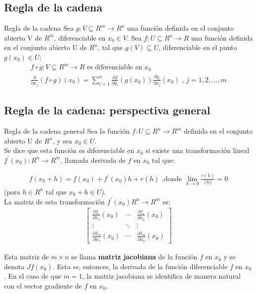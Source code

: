 \documentclass[a4paper, twoside]{article}
\numberwithin{equation}{section}
\numberwithin{figure}{section}
\numberwithin{table}{section}
\begin{document}
\subsection{Regla de la cadena}
\begin{teorema*}{Regla de la cadena}
	Sea $g: V \subseteq R^m \to R^n$ una función definida en el conjunto abierto V de $R^m$, diferenciable en $x_0 \in V$. Sea $f:U\subseteq R^n \to R$ una función definida en el conjunto abierto U de $R^n$, tal que $g(V) \subseteq U$, diferenciable en el punto $g(x_0) \in U$:
	\begin{align}
		f\circ g:V\subseteq R^m \to R \text{ es diferenciable en } x_0 \\
		\frac{\partial}{\partial x_j}(f \circ g)(x_0) = \sum_{i=1}^{n}\frac{\partial f}{\partial y_i}(g(x_0)) \frac{\partial g_i}{\partial x_j} (x_0) \text{ , } j=1,2,\ldots,m
	\end{align}
\end{teorema*}

\subsection{Regla de la cadena: perspectiva general}
\begin{definicion*}{Regla de la cadena general}
	Sea la función $f:U\subseteq R^n \to R^m$ definida en el conjunto abierto U de $R^n$, y sea $x_0\in U$.\\
			
	Se dice que esta función es diferenciable en $x_0$ si existe una transformación lineal $f^\prime (x_0):R^n \to R^m$, llamada derivada de $f$ en $x_0$ tal que:
	
	\begin{align}
		f(x_0+h)=f(x_0)+f^\prime(x_0)h+r(h) \text{ ,donde } \lim_{h\to0}\frac{r\left(h\right)}{\left|\left|h\right|\right|}=0
	\end{align}
	(para $h \in R^n$ tal que $x_0+h\in U$).\\
	
	La matriz de esta transformación $f^\prime(x_0) R^n\to R^m$ es:
	\begin{align}							 
		\left[\begin{array}{ccc}
		\frac{\partial f_1}{\partial x_1}(x_0) & \cdots & \frac{\partial f_1}{\partial x_n}(x_0)\\
		\vdots & \ddots & \vdots\\
		\frac{\partial f_m}{\partial x_1}(x_0) & \cdots & \frac{\partial f_m}{\partial x_n}(x_0)\end{array}\right]
	\end{align}
	
	Esta matriz de $m\times n$ se llama \textbf{matriz jacobiana} de la función $f$ en $x_0$ y se denota $Jf(x_0)$. Esta es, entonces, la derivada de la función diferenciable $f$ en $x_0$. En el caso de que $m=1$, la matriz jacobiana se identifica de manera natural con el vector gradiente de $f$ en $x_0$.\\
\end{definicion*}
\end{document}
